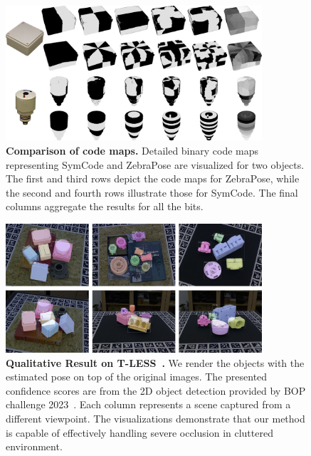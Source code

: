 \begin{figure}[th]
    \centerline{\includegraphics[width=0.85\textwidth]{figure/symnet/compare_code_map.jpg}}
    \caption{\textbf{Comparison of code maps.} Detailed binary code maps representing SymCode and ZebraPose are visualized for two objects. The first and third rows depict the code maps for ZebraPose, while the second and fourth rows illustrate those for SymCode. The final columns aggregate the results for all the bits.}
    \label{fig:compare_code_map}
\end{figure}

\begin{figure}[ht]
    \centerline{\includegraphics[width=0.85\textwidth]{figure/symnet/visualization_tless.jpg}}
    \caption{\textbf{Qualitative Result on T-LESS~\cite{2017tless}.} We render the objects with the estimated pose on top of the original images. The presented confidence scores are from the 2D object detection provided by BOP challenge 2023~\cite{hodan2024bop}. Each column represents a scene captured from a different viewpoint. The visualizations demonstrate that our method is capable of effectively handling severe occlusion in cluttered  environment.}
    \label{fig:visualization_tless}
\end{figure}

